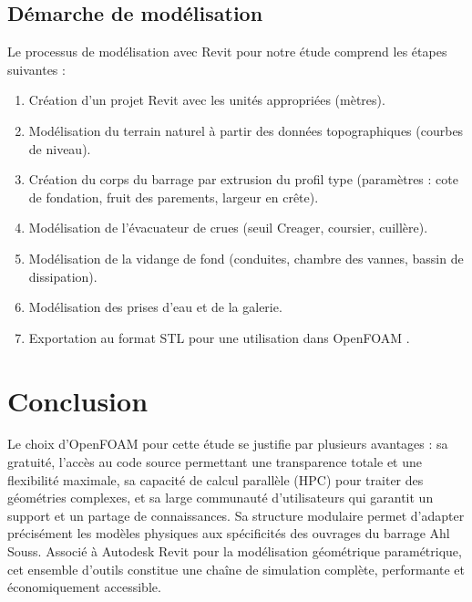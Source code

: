 \subsection{Démarche de modélisation}
\label{subsec:demarche_revit}

Le processus de modélisation avec Revit pour notre étude comprend les étapes suivantes :
\begin{enumerate}
    \item Création d'un projet Revit avec les unités appropriées (mètres).
    \item Modélisation du terrain naturel à partir des données topographiques (courbes de niveau).
    \item Création du corps du barrage par extrusion du profil type (paramètres : cote de fondation, fruit des parements, largeur en crête).
    \item Modélisation de l'évacuateur de crues (seuil Creager, coursier, cuillère).
    \item Modélisation de la vidange de fond (conduites, chambre des vannes, bassin de dissipation).
    \item Modélisation des prises d'eau et de la galerie.
    \item Exportation au format STL pour une utilisation dans OpenFOAM \cite{krygiel2008green}.
\end{enumerate}

\section{Conclusion}
\label{sec:conclusion_benchmark}

Le choix d'OpenFOAM pour cette étude se justifie par plusieurs avantages : sa gratuité, l'accès au code source permettant une transparence totale et une flexibilité maximale, sa capacité de calcul parallèle (HPC) pour traiter des géométries complexes, et sa large communauté d'utilisateurs qui garantit un support et un partage de connaissances. Sa structure modulaire permet d'adapter précisément les modèles physiques aux spécificités des ouvrages du barrage Ahl Souss. Associé à Autodesk Revit pour la modélisation géométrique paramétrique, cet ensemble d'outils constitue une chaîne de simulation complète, performante et économiquement accessible.


